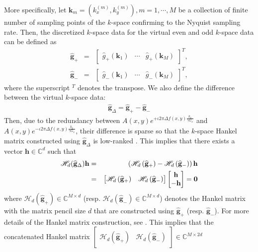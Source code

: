 \documentclass[num-refs]{wiley-article}
\newcommand{\gb}{{\mathbf g}}
\newcommand{\hb}{{\mathbf h}}
\newcommand{\kb}{{\mathbf k}}
\newcommand{\Cd}{{\mathbb C}}
\newcommand{\0}{{\boldsymbol{0}}}
\newcommand{\hank}{\mathscr{H}}
\newcommand{\zerob}{\mathbf{0}}
\newcommand{\1}{\blmath{1}}
\begin{document}
	More specifically, let  $\kb_m =\left(k_x^{(m)},k_y^{(m)}\right), m=1,\cdots, M$ be a collection of finite number of sampling points of the $k$-space confirming to the Nyquist sampling rate. Then,  the discretized $k$-space data  for the virtual even and odd $k$-space data can be defined as
	\begin{eqnarray*}
		\widehat \gb_+  &=& \begin{bmatrix} \widehat g_+(\kb_1) & \cdots  & \widehat g_+(\kb_M) \end{bmatrix}^T ,\\
		\widehat \gb_-  &=& \begin{bmatrix} \widehat g_-(\kb_1) & \cdots  & \widehat g_-(\kb_M) \end{bmatrix}^T  ,
	\end{eqnarray*}
	where the superscript $^T$ denotes the transpose.
	We also define the difference between the virtual $k$-space data:
	\begin{eqnarray}\label{eq:g_delta}
	\widehat \gb_\Delta = \widehat \gb_+ - \widehat \gb_- 
	\end{eqnarray}
	Then, due to the redundancy between
	$A(x,y) e^{+\iota 2\pi \Delta f(x,y)\frac{k_x}{\gamma G_x}}$ and 
	$A(x,y)e^{-\iota 2\pi \Delta f(x,y)\frac{k_x}{\gamma G_x} }$,  their difference is sparse so that
	the $k$-space Hankel matrix constructed using
	$\widehat{\gb}_\Delta$ is low-ranked \cite{ye2017compressive}. 
	This implies that  there exists a vector $\hb\in \Cd^d$ such that
	\begin{eqnarray}\label{eq:an_mat1}
	\hank_d{\left(\widehat \gb_{\Delta}\right)}\hb  &=& \left( \hank_d\left(\widehat \gb_+\right)- \hank_d\left(\widehat\gb_-\right)\right) \hb \notag\\
	& =& \begin{bmatrix} \hank_d\left(\widehat \gb_+\right) &\hank_d\left(\widehat \gb_-\right)\end{bmatrix}\begin{bmatrix} \hb \\ -\hb \end{bmatrix} =\zerob
	\end{eqnarray}
	where $\hank_d\left(\widehat \gb_+\right) \in \Cd^{M\times d}$ (resp. $\hank_d\left(\widehat \gb_-\right) \in \Cd^{M\times d}$) denotes the Hankel matrix with the matrix pencil size $d$ that are constructed using
	$\widehat\gb_+$ (resp. $\widehat\gb_-$). For more details of the Hankel matrix construction, see  \cite{Lee2016reference}.
	This implies that the concatenated Hankel matrix 
	$\begin{bmatrix} \hank_d\left(\widehat \gb_+\right) &\hank_d\left(\widehat \gb_-\right) \end{bmatrix} \in \Cd^{M\times 2d}$
\end{document}
